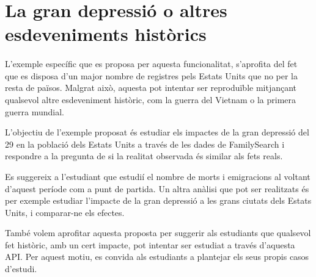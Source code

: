 \section{La gran depressió o altres esdeveniments històrics}

    \paragraph{}
    L'exemple específic que es proposa per aquesta funcionalitat, s'aprofita del fet que es disposa d'un major nombre de registres pels Estats Units que no per la resta de països. Malgrat això, aquesta pot intentar ser reproduïble mitjançant qualsevol altre esdeveniment històric, com la guerra del Vietnam o la primera guerra mundial.

    L'objectiu de l'exemple proposat és estudiar els impactes de la gran depressió del 29 en la població dels Estats Units a través de les dades de FamilySearch i respondre a la pregunta de si la realitat observada és similar als fets reals.

    Es suggereix a l'estudiant que estudií el nombre de morts i emigracions al voltant d'aquest període com a punt de partida. Un altra anàlisi que pot ser realitzats és per exemple estudiar l’impacte de la gran depressió a les grans ciutats dels Estats Units, i comparar-ne els efectes.

    També volem aprofitar aquesta proposta per suggerir als estudiants que qualsevol fet històric, amb un cert impacte, pot intentar ser estudiat a través d'aquesta API. Per aquest motiu, es convida als estudiants a plantejar els seus propis casos d'estudi.
